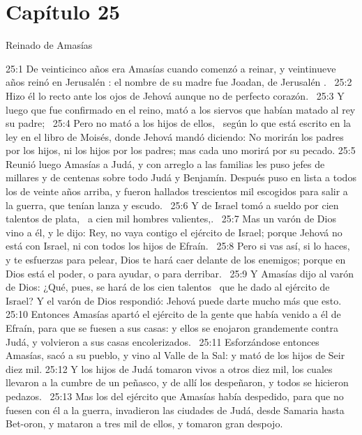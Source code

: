 						\section*{Capítulo 25 }
																									Reinado de Amasías  
																									
																									
																									25:1 De veinticinco años era Amasías cuando comenzó a reinar, y veintinueve años reinó en Jerusalén : el nombre de su madre fue Joadan, de Jerusalén .  
																									25:2 Hizo él lo recto ante los ojos de Jehová aunque no de perfecto corazón.  
																									25:3 Y luego que fue confirmado en el reino, mató a los siervos que habían matado al rey su padre;  
																									25:4 Pero no mató a los hijos de ellos,  según lo que está escrito en la ley en el libro de Moisés, donde Jehová mandó diciendo: No morirán los padres por los hijos, ni los hijos por los padres; mas cada uno morirá por su pecado. 
																									25:5 Reunió luego Amasías a Judá, y con arreglo a las familias les puso jefes de millares y de centenas sobre todo Judá y Benjamín. Después puso en lista a todos los de veinte años arriba, y fueron hallados trescientos mil escogidos para salir a la guerra, que tenían lanza y escudo.  
																									25:6 Y de Israel tomó a sueldo por cien talentos de plata,  a cien mil hombres valientes,.  
																									25:7 Mas un varón de Dios vino a él, y le dijo: Rey, no vaya contigo el ejército de Israel; porque Jehová no está con Israel, ni con todos los hijos de Efraín.  
																									25:8 Pero si vas así, si lo haces, y te esfuerzas para pelear, Dios te hará caer delante de los enemigos; porque en Dios está el poder, o para ayudar, o para derribar.  
																									25:9 Y Amasías dijo al varón de Dios: ¿Qué, pues, se hará de los cien talentos  que he dado al ejército de Israel? Y el varón de Dios respondió: Jehová puede darte mucho más que esto.  
																									25:10 Entonces Amasías apartó el ejército de la gente que había venido a él de Efraín, para que se fuesen a sus casas: y ellos se enojaron grandemente contra Judá, y volvieron a sus casas encolerizados.  
																									25:11 Esforzándose entonces Amasías, sacó a su pueblo, y vino al Valle de la Sal: y mató de los hijos de Seir diez mil. 
																									25:12 Y los hijos de Judá tomaron vivos a otros diez mil, los cuales llevaron a la cumbre de un peñasco, y de allí los despeñaron, y todos se hicieron pedazos.  
																									25:13 Mas los del ejército que Amasías había despedido, para que no fuesen con él a la guerra, invadieron las ciudades de Judá, desde Samaria hasta Bet-oron, y mataron a tres mil de ellos, y tomaron gran despojo.  
